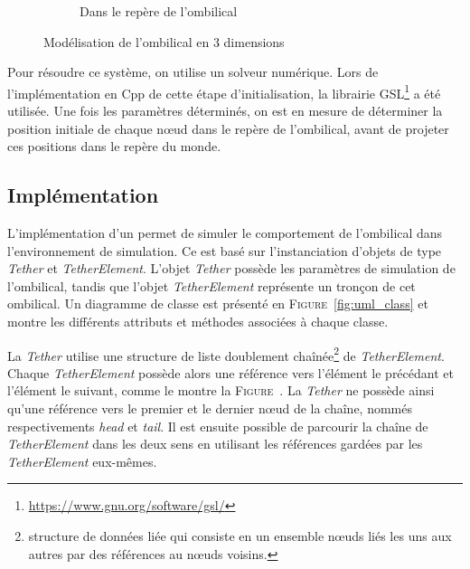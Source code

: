 \begin{figure}
\begin{subfigure}[b]{0.45\textwidth}
						\caption{Dans le repère de l'ombilical}
						\label{fig:2d_plot}
					\end{subfigure}
					\caption{Modélisation de l'ombilical en 3 dimensions}
				\end{figure}
				
				Pour résoudre ce système, on utilise un solveur numérique. Lors de l'implémentation en \gls{Cpp} de cette étape d'initialisation, la librairie \gls{GSL}\footnote{\url{https://www.gnu.org/software/gsl/}} a été utilisée. Une fois les paramètres déterminés, on est en mesure de déterminer la position initiale de chaque n\oe ud dans le repère de l'ombilical, avant de projeter ces positions dans le repère du monde.
			
			\subsection{Implémentation}
				L'implémentation d'un \plugin{} \gazebo{} permet de simuler le comportement de l'ombilical dans l'environnement de simulation. Ce \plugin{} est basé sur l'instanciation d'objets de type \textit{Tether} et \textit{TetherElement}. L'objet \textit{Tether} possède les paramètres de simulation de l'ombilical, tandis que l'objet \textit{TetherElement} représente un tronçon de cet ombilical. Un diagramme de classe est présenté en \textsc{Figure}~\ref{fig:uml_class} et montre les différents attributs et méthodes associées à chaque classe.
				
				La \textit{Tether} utilise une structure de liste doublement chaînée\footnote{structure de données liée qui consiste en un ensemble n\oe uds liés les uns aux autres par des références au n\oe uds voisins.} de \textit{TetherElement}. Chaque \textit{TetherElement} possède alors une référence vers l'élément le précédant et l'élément le suivant, comme le montre la \textsc{Figure}~\label{fig:goubly_linked_list}. La \textit{Tether} ne possède ainsi qu'une référence vers le premier et le dernier n\oe ud de la chaîne, nommés respectivements \textit{head} et \textit{tail}. Il est ensuite possible de parcourir la chaîne de \textit{TetherElement} dans les deux sens en utilisant les références gardées par les \textit{TetherElement} eux-mêmes. 
			
